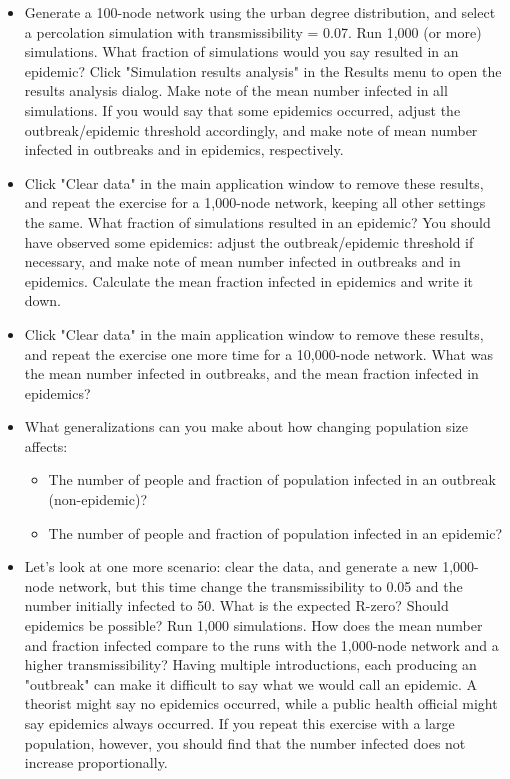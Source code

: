 \documentclass{article}
\begin{document}
\begin{itemize}
  \item Generate a 100-node network using the urban degree distribution, and select a percolation simulation with transmissibility = 0.07.  Run 1,000 (or more) simulations.  What fraction of simulations would you say resulted in an epidemic? Click "Simulation results analysis" in the Results menu to open the results analysis dialog.  Make note of the mean number infected in all simulations.  If you would say that some epidemics occurred, adjust the outbreak/epidemic threshold accordingly, and make note of mean number infected in outbreaks and in epidemics, respectively.
  
  \item Click "Clear data" in the main application window to remove these results, and repeat the exercise for a 1,000-node network, keeping all other settings the same.  What fraction of simulations resulted in an epidemic?  You should have observed some epidemics: adjust the outbreak/epidemic threshold if necessary, and make note of mean number infected in outbreaks and in epidemics.  Calculate the mean fraction infected in epidemics and write it down.

  \item Click "Clear data" in the main application window to remove these results, and repeat the exercise one more time for a 10,000-node network.  What was the mean number infected in outbreaks, and the mean fraction infected in epidemics?
  
  \item What generalizations can you make about how changing population size affects:
  \begin{itemize}
    \item The number of people and fraction of population infected in an outbreak (non-epidemic)?
    \item The number of people and fraction of population infected in an epidemic?
  \end{itemize}
  
  \item Let's look at one more scenario: clear the data, and generate a new 1,000-node network, but this time change the transmissibility to 0.05 and the number initially infected to 50.  What is the expected R-zero?  Should epidemics be possible?  Run 1,000 simulations.  How does the mean number and fraction infected compare to the runs with the 1,000-node network and a higher transmissibility?  Having multiple introductions, each producing an "outbreak" can make it difficult to say what we would call an epidemic.  A theorist might say no epidemics occurred, while a public health official might say epidemics always occurred.  If you repeat this exercise with a large population, however, you should find that the number infected does not increase proportionally.
\end{itemize}
\end{document}
